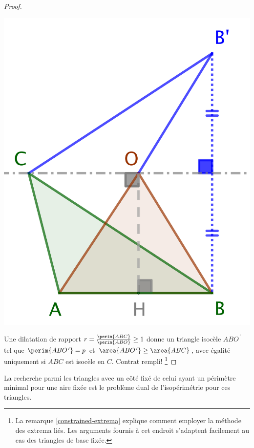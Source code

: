 \begin{proof}
	\begin{center}
		\includegraphics[scale=.4]{content/triangle-one-side-fixed/proof.png}
	\end{center}
	
	Une dilatation  de rapport $r = \frac{\perim{ABC}}{\perim{ABO}} \geq 1$ donne un triangle isocèle $ABO^{\,\prime}$ tel que 
	$\perim{ABO^{\,\prime}} = p$
	et 
	$\area{ABO^{\,\prime}} \geq \area{ABC}$, avec égalité uniquement si $ABC$ est isocèle en $C$. 
	Contrat rempli!%
	\footnote{
		La remarque \ref{constrained-extrema} explique comment employer la méthode des extrema liés. 
		Les arguments fournis à cet endroit s'adaptent facilement au cas des triangles de base fixée.
	}
\end{proof}




\begin{remark}
	La recherche parmi les triangles avec un côté fixé de celui ayant un périmètre minimal pour une aire fixée est le problème dual de l'isopérimétrie pour ces triangles.
\end{remark}
